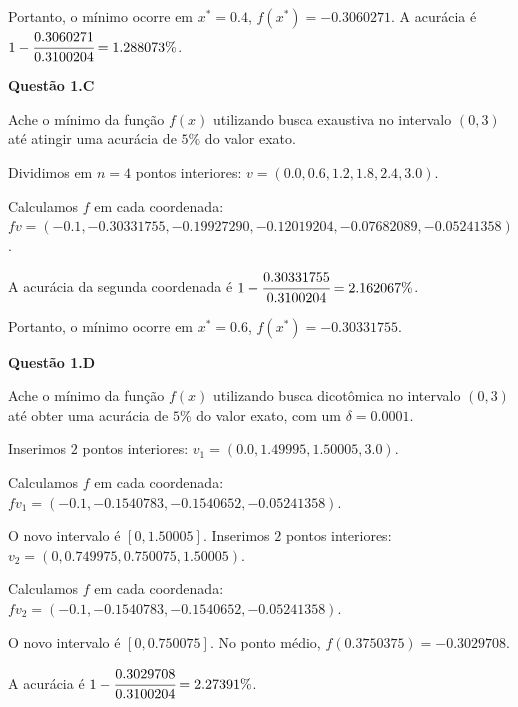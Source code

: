 \documentclass{rbfin}
\begin{document}
Portanto, o mínimo ocorre em $x^* = 0.4$, $f(x^*) = -0.3060271$. A acurácia é $1 - \cfrac{0.3060271}{0.3100204} = 1.288073\%$.

\singlespacing

\vspace{6mm}

\large

\textbf{Questão 1.C}

\normalsize

\vspace{6mm}

\doublespacing

Ache o mínimo da função $f(x)$ utilizando busca exaustiva no intervalo $(0, 3)$ até atingir uma acurácia de $5\%$ do valor exato.

Dividimos em $n = 4$ pontos interiores: $v = (0.0, 0.6, 1.2, 1.8, 2.4, 3.0)$.

Calculamos $f$ em cada coordenada: $fv = (-0.1, -0.30331755, -0.19927290, -0.12019204, -0.07682089, -0.05241358)$.

A acurácia da segunda coordenada é $1 - \cfrac{0.30331755}{0.3100204} = 2.162067\%$.

Portanto, o mínimo ocorre em $x^* = 0.6$, $f(x^*) = -0.30331755$.

\singlespacing

\newpage

\large

\textbf{Questão 1.D}

\normalsize

\vspace{6mm}

\doublespacing

Ache o mínimo da função $f(x)$ utilizando busca dicotômica no intervalo $(0, 3)$ até obter uma acurácia de $5\%$ do valor exato, com um $\delta = 0.0001$.

Inserimos $2$ pontos interiores: $v_1 = (0.0, 1.49995, 1.50005, 3.0)$.

Calculamos $f$ em cada coordenada: $fv_1 = (-0.1, -0.1540783, -0.1540652, -0.05241358)$.

O novo intervalo é $[0, 1.50005]$. Inserimos $2$ pontos interiores: $v_2 = (0, 0.749975, 0.750075, 1.50005)$.

Calculamos $f$ em cada coordenada: $fv_2 = (-0.1, -0.1540783, -0.1540652, -0.05241358)$.

O novo intervalo é $[0, 0.750075]$. No ponto médio, $f(0.3750375) = -0.3029708$.

A acurácia é $1 - \cfrac{0.3029708}{0.3100204} = 2.27391\%$.
\end{document}
